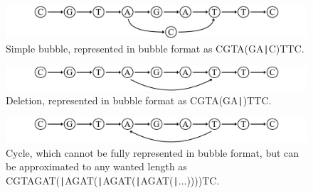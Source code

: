 \documentclass[a4paper,12pt,twoside,BCOR=10mm]{scrbook}
\def\pipe{\texttt{|}}
\begin{document}
\begin{figure}[!htb]
\centering
\includegraphics[width=\textwidth]{evo_fig_STPUbubble_f.pdf}
\caption[Simple bubble in bubble format]{Simple bubble, represented in bubble format as \textup{CGTA(GA\pipe C)TTC}.} \label{fig:evo_fig_STPUbubble_f}
\end{figure}
\begin{figure}[!htb]
\centering
\includegraphics[width=\textwidth]{evo_fig_STPUinsertion_f.pdf}
\caption[Deletion in bubble format]{Deletion, represented in bubble format as \textup{CGTA(GA\pipe )TTC}.} \label{fig:evo_fig_STPUinsertion_f}
\end{figure}
\begin{figure}[!htb]
\centering
\includegraphics[width=\textwidth]{evo_fig_STPUcycle_f.pdf}
\caption[Cycle in bubble format]{Cycle, which cannot be fully represented in bubble format, but can be approximated to any wanted length as \textup{CGTAGAT(\pipe AGAT(\pipe AGAT(\pipe AGAT(\pipe ...))))TC}.} \label{fig:evo_fig_STPUcycle_f}
\end{figure}
\end{document}
